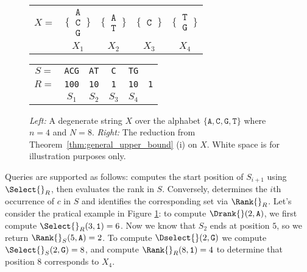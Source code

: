 \begin{figure}[h!]
    \centering

    \begin{tabular}{c@{\hskip 0.5em}c@{\hskip 0.5em}c@{\hskip 0.5em}c@{\hskip 0.5em}c}
        $X = $                                                               & $\Bigg\{\,\begin{matrix}\texttt{A}\\\texttt{C}\\\texttt{G}\end{matrix}\,\Bigg\}$ &
        $\Bigg\{\,\begin{matrix}\texttt{A}\\\texttt{T}\end{matrix}\,\Bigg\}$ &
        $\Bigg\{\,\begin{matrix}\texttt{C}\end{matrix}\,\Bigg\}$             &
        $\Bigg\{\,\begin{matrix}\texttt{T}\\\texttt{G}\end{matrix}\,\Bigg\}$                                                                                                            \\
                                                                             & $X_1$                                                                            & $X_2$ & $X_3$ & $X_4$
    \end{tabular}\qquad\begin{tabular}{c@{\hskip 0.5em}c@{\hskip 0.5em}c@{\hskip 0.5em}c@{\hskip 0.5em}c@{\hskip 0.5em}c}
        $S =$  & \texttt{ACG} & \texttt{AT} & \texttt{C} & \texttt{TG} &            \\
        $R = $ & \texttt{100} & \texttt{10} & \texttt{1} & \texttt{10} & \texttt{1} \\
               & $S_1$        & $S_2$       & $S_3$      & $S_4$
    \end{tabular}
    \caption{\emph{Left:} A degenerate string $X$ over the alphabet $\{\texttt{A}, \texttt{C}, \texttt{G}, \texttt{T}\}$ where $n = 4$ and $N = 8$. \emph{Right:} The reduction from Theorem~\ref{thm:general_upper_bound} (i) on $X$. White space is for illustration purposes only.}
    \label{fig:reduction_example}
\end{figure}

\noindent Queries are supported as follows: \Drank{} computes the start position of $S_{i+1}$ using $\Select{}_R$, then evaluates the rank in $S$. Conversely, \Dselect{} determines the $i$th occurrence of $c$ in $S$ and identifies the corresponding set via $\Rank{}_R$. Let's consider the pratical example in Figure \ref{fig:reduction_example}: to compute $\Drank{}(2,\texttt{A})$, we first compute $\Select{}_R(3,\texttt{1}) = 6$. Now we know that $S_2$ ends at position $5$, so we return $\Rank{}_S(5, \texttt{A}) = 2$. To compute $\Dselect{}(2, \texttt{G})$ we compute $\Select{}_S(2,\texttt{G}) = 8$, and compute $\Rank{}_R(8,\texttt{1}) = 4$ to determine that position 8 corresponds to $X_4$. \vspace{1em}


